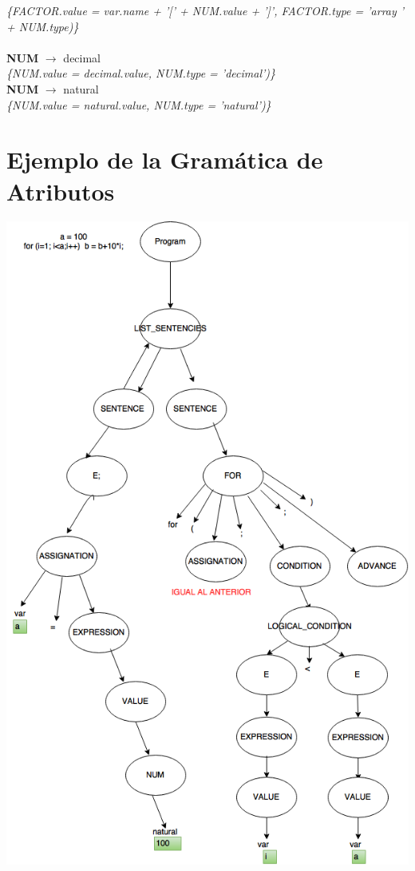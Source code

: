 \documentclass[10pt,a4paper]{article}
\begin{document}
\textit{\{FACTOR.value = var.name + '[' + NUM.value + ']', FACTOR.type = 'array ' + NUM.type)\}}  \\ 
\\

\textbf{NUM} $\rightarrow$ decimal \\

\textit{\{NUM.value = decimal.value, NUM.type = 'decimal')\}}  \\ 

\textbf{NUM} $\rightarrow$ natural \\

\textit{\{NUM.value = natural.value, NUM.type = 'natural')\}}  \\ 


\section{Ejemplo de la Gramática de Atributos}

\begin{center}
\includegraphics[scale=0.7]{imgs/ejemploGramatica.png}
\end{center}
\end{document}
